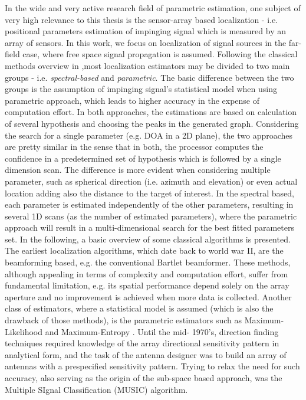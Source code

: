 In the wide and very active research field of parametric estimation, one subject of very high relevance to this thesis is the sensor-array based localization - i.e. positional parameters estimation of impinging signal which is measured by an array of sensors.
In this work, we focus on localization of signal sources in the far-field case, where free space signal propagation is assumed.
Following the classical methods overview in \cite{krim1996two},most localization estimators may be divided to two main groups - i.e. \textit{spectral-based} and \textit{parametric}.
The basic difference between the two groups is the assumption of impinging signal's statistical model when using parametric approach, which leads to higher accuracy in the expense of computation effort.
In both approaches, the estimations are based on calculation of several hypothesis and choosing the peaks in the generated graph.
Considering the search for a single parameter (e.g. DOA in a 2D plane), the two approaches are pretty similar in the sense that in both, the processor computes the confidence in a predetermined set of hypothesis which is followed by a single dimension scan.
The difference is more evident when considering multiple parameter, such as spherical direction (i.e. azimuth and elevation) or even actual location adding also the distance to the target of interest.
In the spectral based, each parameter is estimated independently of the other parameters, resulting in several 1D scans (as the number of estimated parameters), where the parametric approach will result in a multi-dimensional search for the best fitted parameters set.
In the following, a basic overview of some classical algorithms is presented.
The earliest localization algorithms, which date back to world war II, are the beamforming based, e.g. the conventional Bartlet beamformer.
These methods, although appealing in terms of complexity and computation effort, suffer from fundamental limitation, e.g. its spatial performance depend solely on the array aperture and no improvement is achieved when more data is collected.
Another class of estimators, where a statistical model is assumed (which is also the drawback of those methods), is the parametric estimators such as Maximum-Likelihood \cite{TWODECADES-81/106} and Maximum-Entropy \cite{TWODECADES-23}.
Until the mid- 1970's, direction finding techniques required knowledge of the array directional sensitivity pattern in analytical form, and the task of the antenna designer was to build an array of antennas with a prespecified sensitivity pattern.
Trying to relax the need for such accuracy, also serving as the origin of the sub-space based approach, was the Multiple SIgnal Classification (MUSIC) \cite{MUSIC_} algorithm.
